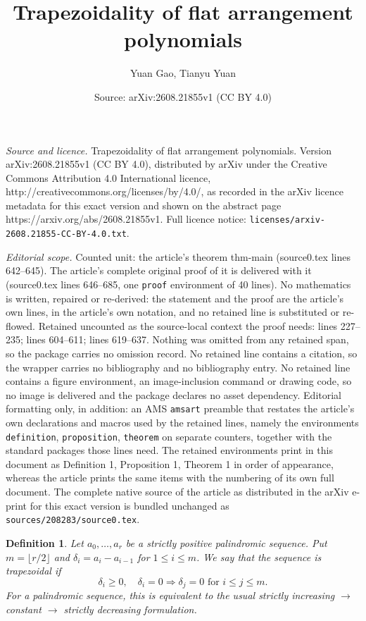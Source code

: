 \documentclass[10pt,a4paper]{amsart}
\title{Trapezoidality of flat arrangement polynomials}
\author{Yuan Gao, Tianyu Yuan}
\date{Source: arXiv:2608.21855v1 (CC BY 4.0)}
\newtheorem{definition}{Definition}
\begin{document}
\maketitle

\noindent\emph{Source and licence.} Trapezoidality of flat arrangement polynomials. Version arXiv:2608.21855v1 (CC BY 4.0), distributed by arXiv under the Creative Commons Attribution 4.0 International licence, http://creativecommons.org/licenses/by/4.0/, as recorded in the arXiv licence metadata for this exact version and shown on the abstract page https://arxiv.org/abs/2608.21855v1. Full licence notice: \texttt{licenses/arxiv-2608.21855-CC-BY-4.0.txt}.\par\smallskip

\noindent\textit{Editorial scope.} Counted unit: the article's theorem thm-main (source0.tex lines 642--645). The article's complete original proof of it is delivered with it (source0.tex lines 646--685, one \texttt{proof} environment of 40 lines). No mathematics is written, repaired or re-derived: the statement and the proof are the article's own lines, in the article's own notation, and no retained line is substituted or re-flowed.  Retained uncounted as the source-local context the proof needs: lines 227--235; lines 604--611; lines 619--637.  Nothing was omitted from any retained span, so the package carries no omission record.  No retained line contains a citation, so the wrapper carries no bibliography and no bibliography entry.  No retained line contains a figure environment, an image-inclusion command or drawing code, so no image is delivered and the package declares no asset dependency.  Editorial formatting only, in addition: an AMS \texttt{amsart} preamble that restates the article's own declarations and macros used by the retained lines, namely the environments \texttt{definition}, \texttt{proposition}, \texttt{theorem} on separate counters, together with the standard packages those lines need.  The retained environments print in this document as Definition 1, Proposition 1, Theorem 1 in order of appearance, whereas the article prints the same items with the numbering of its own full document.  The complete native source of the article as distributed in the arXiv e-print for this exact version is bundled unchanged as \texttt{sources/208283/source0.tex}.
\begin{definition}
  \label{def-trapezoidal}
  Let $a_0,\dots,a_r$ be a strictly positive palindromic sequence. Put $m=\lfloor r/2\rfloor$ and $\delta_i=a_i-a_{i-1}$ for $1\leq i\leq m$.
  We say that the sequence is \emph{ trapezoidal} if
  \begin{equation}
    \delta_i\geq 0,\quad \delta_i=0 \Longrightarrow \delta_j=0\text{  for  } i\leq j\leq m.
  \end{equation}
  For a palindromic sequence, this is equivalent to the usual strictly increasing $\to$ constant $\to$ strictly decreasing formulation.
\end{definition}
\end{document}
